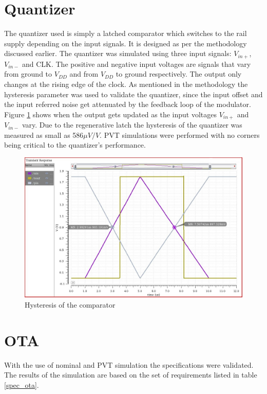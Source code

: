 \section{Quantizer}
The quantizer used is simply a latched comparator which switches to the rail supply depending on the input signals. It is designed as per the methodology discussed earlier. The quantizer was simulated using three input signals: $V_{in+}$, $V_{in-}$ and CLK. The positive and negative input voltages are signals that vary from ground to $V_{DD}$ and from $V_{DD}$ to ground respectively. The output only changes at the rising edge of the clock. As mentioned in the methodology the hysteresis parameter was used to validate the quantizer, since the input offset and the input referred noise get attenuated by the feedback loop of the modulator. Figure \ref{comparator_out} shows when the output gets updated as the input voltages $V_{in+}$ and $V_{in-}$ vary. Due to the regenerative latch the hysteresis of the quantizer was measured as small as 586$\mu V/V$. PVT simulations were performed with no corners being critical to the quantizer's performance. 

\begin{figure}[H]
\centering
\includegraphics[width=\textwidth]{images/Comperator_output.jpg}
\caption{Hysteresis of the comparator}
\label{comparator_out}
\end{figure}


\section{OTA}
With the use of nominal and PVT simulation the specifications were validated. The results of the simulation are based on the set of requirements listed in table \ref{spec_ota}. 

